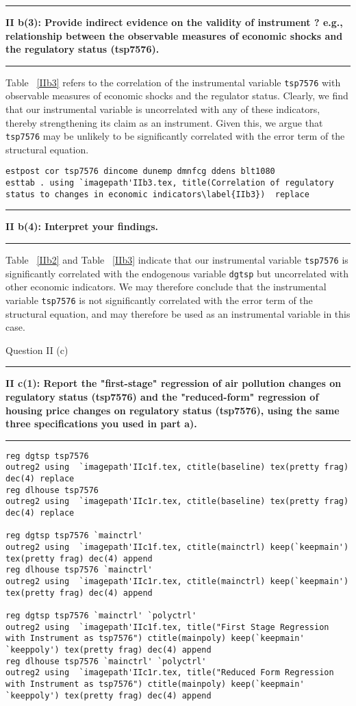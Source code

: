 \documentclass[12pt]{article}
\newcommand\question[2]{\vspace{1em}\hrule\vspace{1em}\textbf{#1: #2}\vspace{1em}\hrule\vspace{1em}}
\begin{document}
\question{II b(3)}{Provide indirect evidence on the validity of instrument ? e.g., relationship between the observable measures of economic shocks and the regulatory status (tsp7576). }
Table ~\ref{IIb3} refers to the correlation of the instrumental variable \verb|tsp7576| with observable measures of economic shocks and the regulator status. Clearly, we find that our instrumental variable is uncorrelated with any of these indicators, thereby strengthening its claim as an instrument. Given this, we argue that \verb|tsp7576| may be unlikely to be significantly correlated with the error term of the structural equation.

\begin{lstlisting}
estpost cor tsp7576 dincome dunemp dmnfcg ddens blt1080
esttab . using `imagepath'IIb3.tex, title(Correlation of regulatory status to changes in economic indicators\label{IIb3})  replace
\end{lstlisting}


\question{II b(4)}{ Interpret your findings. }
Table ~\ref{IIb2} and Table ~\ref{IIb3} indicate that our instrumental variable \verb|tsp7576| is significantly correlated with the endogenous variable \verb|dgtsp| but uncorrelated with other economic indicators. We may therefore conclude that the instrumental variable \verb|tsp7576|  is not significantly correlated with the error term of the structural equation, and may therefore be used as an instrumental variable in this case.

\begin{center}\LARGE{Question II (c)}\end{center}
\question{II c(1)}{Report the "first-stage" regression of air pollution changes on regulatory status (tsp7576) and the "reduced-form" regression of housing price changes on regulatory status (tsp7576), using the same three specifications you used in part a).   }
\begin{lstlisting}
reg dgtsp tsp7576
outreg2 using  `imagepath'IIc1f.tex, ctitle(baseline) tex(pretty frag) dec(4) replace
reg dlhouse tsp7576
outreg2 using  `imagepath'IIc1r.tex, ctitle(baseline) tex(pretty frag) dec(4) replace

reg dgtsp tsp7576 `mainctrl'
outreg2 using  `imagepath'IIc1f.tex, ctitle(mainctrl) keep(`keepmain') tex(pretty frag) dec(4) append
reg dlhouse tsp7576 `mainctrl'
outreg2 using  `imagepath'IIc1r.tex, ctitle(mainctrl) keep(`keepmain') tex(pretty frag) dec(4) append

reg dgtsp tsp7576 `mainctrl' `polyctrl'
outreg2 using  `imagepath'IIc1f.tex, title("First Stage Regression with Instrument as tsp7576") ctitle(mainpoly) keep(`keepmain' `keeppoly') tex(pretty frag) dec(4) append
reg dlhouse tsp7576 `mainctrl' `polyctrl'
outreg2 using  `imagepath'IIc1r.tex, title("Reduced Form Regression with Instrument as tsp7576") ctitle(mainpoly) keep(`keepmain' `keeppoly') tex(pretty frag) dec(4) append
\end{lstlisting}
\end{document}
